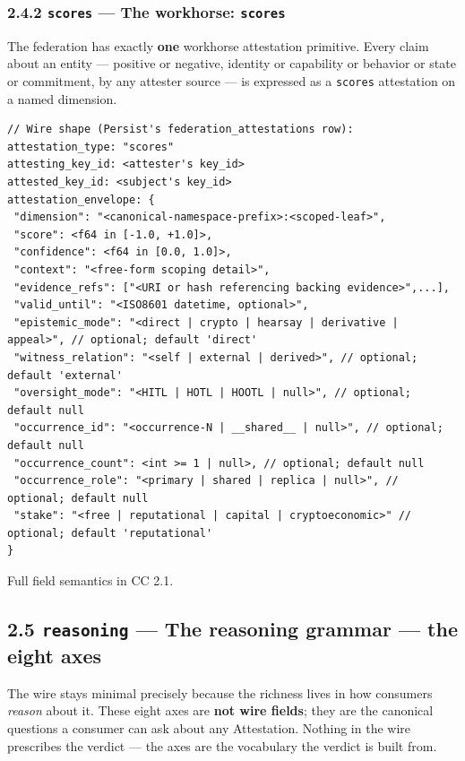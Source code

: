 \documentclass[11pt]{article}
\begin{document}
\subsubsection*{2.4.2 \texttt{scores} — The workhorse: \texttt{scores}}


The federation has exactly \textbf{one} workhorse attestation primitive. Every claim about an entity — positive or negative, identity or capability or behavior or state or commitment, by any attester source — is expressed as a \texttt{scores} attestation on a named dimension.


\begin{lstlisting}
// Wire shape (Persist's federation_attestations row):
attestation_type: "scores"
attesting_key_id: <attester's key_id>
attested_key_id: <subject's key_id>
attestation_envelope: {
 "dimension": "<canonical-namespace-prefix>:<scoped-leaf>",
 "score": <f64 in [-1.0, +1.0]>,
 "confidence": <f64 in [0.0, 1.0]>,
 "context": "<free-form scoping detail>",
 "evidence_refs": ["<URI or hash referencing backing evidence>",...],
 "valid_until": "<ISO8601 datetime, optional>",
 "epistemic_mode": "<direct | crypto | hearsay | derivative | appeal>", // optional; default 'direct'
 "witness_relation": "<self | external | derived>", // optional; default 'external'
 "oversight_mode": "<HITL | HOTL | HOOTL | null>", // optional; default null
 "occurrence_id": "<occurrence-N | __shared__ | null>", // optional; default null
 "occurrence_count": <int >= 1 | null>, // optional; default null
 "occurrence_role": "<primary | shared | replica | null>", // optional; default null
 "stake": "<free | reputational | capital | cryptoeconomic>" // optional; default 'reputational'
}
\end{lstlisting}

Full field semantics in CC 2.1.


\subsection*{2.5 \texttt{reasoning} — The reasoning grammar — the eight axes}


The wire stays minimal precisely because the richness lives in how consumers \textit{reason} about it. These eight axes are \textbf{not wire fields}; they are the canonical questions a consumer can ask about any Attestation. Nothing in the wire prescribes the verdict — the axes are the vocabulary the verdict is built from.
\end{document}
